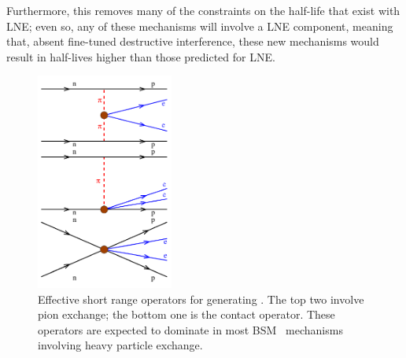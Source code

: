 \documentclass[/main.tex]{subfiles}
\begin{document}
Furthermore, this removes many of the constraints on the half-life that exist with LNE; even so, any of these mechanisms will involve a LNE component, meaning that, absent fine-tuned destructive interference, these new mechanisms would result in half-lives higher than those predicted for LNE.
\begin{figure}[t]
  \centering
  \includegraphics[width=0.4\textwidth]{znbbshortrange}
  \caption[Effective Pion Exchange Operators for \znbb]{\label{fig:znbbeffpion}
    Effective short range operators for generating \znbb. The top two involve pion exchange; the bottom one is the contact operator. These operators are expected to dominate in most BSM \znbb\ mechanisms involving heavy particle exchange.
  }
\end{figure}
\end{document}
